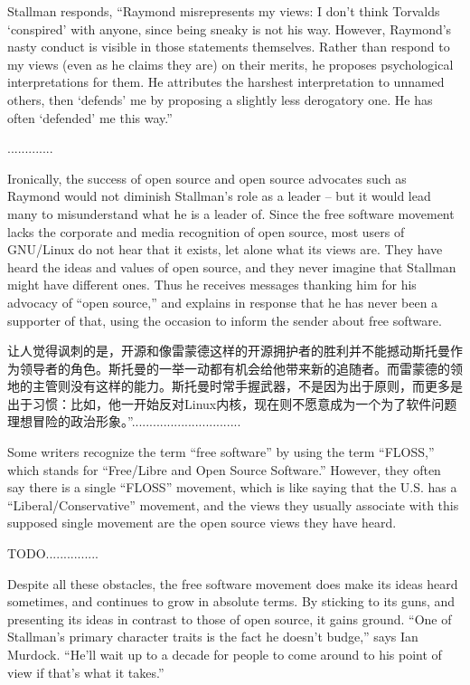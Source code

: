 \ifdefined\eng
Stallman responds, ``Raymond misrepresents my views: I don't think Torvalds `conspired' with anyone, since being sneaky is not his way. However, Raymond's nasty conduct is visible in those statements themselves.   Rather than respond to my views (even as he claims they are) on their merits, he proposes psychological interpretations for them. He attributes the harshest interpretation to unnamed others, then `defends' me by proposing a slightly less derogatory one.  He has often `defended' me this way.''
\fi

\ifdefined\chs
.............
\fi

\ifdefined\eng
Ironically, the success of open source and open source advocates such as Raymond would not diminish Stallman's role as a leader -- but it would lead many to misunderstand what he is a leader of.  Since the free software movement lacks the corporate and media recognition of open source, most users of GNU/Linux do not hear that it exists, let alone what its views are.  They have heard the ideas and values of open source, and they never imagine that Stallman might have different ones.  Thus he receives messages thanking him for his advocacy of ``open source,'' and explains in response that he has never been a supporter of that, using the occasion to inform the sender about free software.
\fi

\ifdefined\chs
让人觉得讽刺的是，开源和像雷蒙德这样的开源拥护者的胜利并不能撼动斯托曼作为领导者的角色。斯托曼的一举一动都有机会给他带来新的追随者。而雷蒙德的领地的主管则没有这样的能力。斯托曼时常手握武器，不是因为出于原则，而更多是出于习惯：比如，他一开始反对Linux内核，现在则不愿意成为一个为了软件问题理想冒险的政治形象。”...............................
\fi

\ifdefined\eng
Some writers recognize the term ``free software'' by using the term ``FLOSS,'' which stands for ``Free/Libre and Open Source Software.''  However, they often say there is a single ``FLOSS'' movement, which is like saying that the U.S. has a ``Liberal/Conservative'' movement, and the views they usually associate with this supposed single movement are the open source views they have heard.
\fi

\ifdefined\chs
TODO...............
\fi

\ifdefined\eng
Despite all these obstacles, the free software movement does make its ideas heard sometimes, and continues to grow in absolute terms.  By sticking to its guns, and presenting its ideas in contrast to those of open source, it gains ground. ``One of Stallman's primary character traits is the fact he doesn't budge,'' says Ian Murdock. ``He'll wait up to a decade for people to come around to his point of view if that's what it takes.''
\fi

